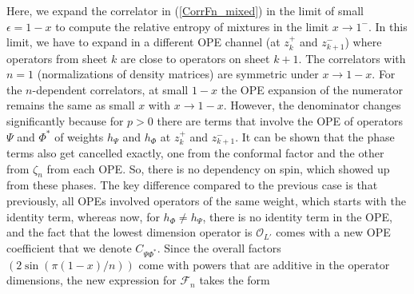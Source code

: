 \documentclass[11pt]{article}
\newcommand{\ep}{\epsilon}
\newcommand{\mO}{\mathcal{O}}
\newcommand{\nn}{\nonumber}
\newcommand{\lb}{\left(}
\newcommand{\rb}{\right)}
\begin{document}
Here, we expand the correlator in (\ref{CorrFn_mixed}) in the limit of small $\ep=1-x$ to compute the relative entropy of mixtures in the limit $x\to 1^-$. In this limit, we have to expand in a different OPE channel (at $z_k^+$ and $z_{k+1}^-$) where operators from sheet $k$ are close to operators on sheet $k+1$. The correlators with $n=1$ (normalizations of density matrices) are symmetric under $x\to 1-x$. For the $n$-dependent correlators, at small $1-x$ the OPE expansion of the numerator remains the same as small $x$ with $x\to 1-x$. However, the denominator changes significantly because for $p>0$ there are terms that involve the OPE of operators $\Psi$ and $\Phi^*$ of weights $h_\Psi$ and $h_{\Phi}$ at $z_k^+$ and $z_{k+1}^-$. It can be shown that the phase terms also get cancelled exactly, one from the conformal factor and the other from $\zeta_n$ from each OPE. So, there is no dependency on spin, which showed up from these phases. 
  The key difference compared to the previous case is that previously, all OPEs involved operators of the same weight, which starts with the identity term, whereas now, for $h_\Phi\neq h_\Psi$, there is no identity term in the OPE, and the fact that the lowest dimension operator is $\mO_{L'}$ comes with a new OPE coefficient that we denote $C_{\Psi\Phi^*}$. Since the overall factors $(2\sin(\pi (1-x)/n))$ come with powers that are additive in the operator dimensions, the new expression for $\mathcal{F}_n$  takes the form
\end{document}
